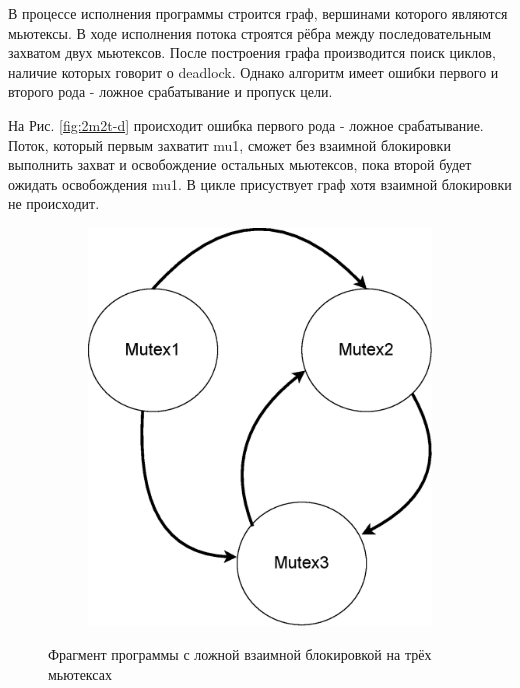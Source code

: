 В процессе исполнения программы строится граф, вершинами которого являются мьютексы. В ходе исполнения потока строятся рёбра между последовательным захватом двух мьютексов. После построения графа производится поиск циклов, наличие которых говорит о deadlock. Однако алгоритм имеет ошибки первого и второго рода - ложное срабатывание и пропуск цели.

На Рис. \ref{fig:2m2t-d} происходит ошибка первого рода - ложное срабатывание. Поток, который первым захватит mu1, сможет без взаимной блокировки выполнить захват и освобождение остальных мьютексов, пока второй будет ожидать освобождения mu1. В цикле присуствует граф хотя взаимной блокировки не происходит.

\begin{figure}[htbp]
    \centering
    \begin{subfigure}[h]{0.4\textwidth}
        \centering
        
    \end{subfigure}
    \hfill
    \begin{subfigure}[h]{0.4\textwidth}
        \centering
        \includegraphics[width=\textwidth]{inc/chapter-first/3m2t-du.eps}
    \end{subfigure}
    \caption{Фрагмент программы с ложной взаимной блокировкой на трёх мьютексах}
    \label{fig:3m2t-du}
\end{figure}

